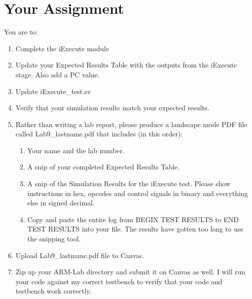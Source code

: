 \section{Your Assignment}
You are to:
\begin{enumerate}
\item Complete the iExecute module 
\item Update your Expected Results Table with the outputs from the iExecute stage.  Also add a PC value. 
\item Update iExecute\_test.sv
\item Verify that your simulation results match your expected results.
\item Rather than writing a lab report, please produce a landscape mode PDF file called Lab9\_lastname.pdf that includes (in this order):
\begin{enumerate}
	\item Your name and the lab number.
	\item A snip of your completed Expected Results Table.
	\item A snip of the Simulation Results for the iExecute test.  Please show instructions in hex, opcodes and control signals in binary and everything else in signed decimal.  
	\item Copy and paste the entire log from BEGIN TEST RESULTS to END TEST RESULTS into your file.  The results have gotten too long to use the snipping tool.	
\end{enumerate}
\item Upload Lab9\_lastname.pdf file to Canvas.
\item Zip up your ARM-Lab directory and submit it on Canvas as well.  I will run your code against my correct testbench to verify that your code and testbench work correctly.

\end{enumerate} 